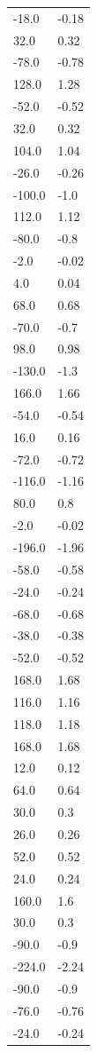 \begin{longtable}{ll}
-18.0 & -0.18 \\
32.0 & 0.32 \\
-78.0 & -0.78 \\
128.0 & 1.28 \\
-52.0 & -0.52 \\
32.0 & 0.32 \\
104.0 & 1.04 \\
-26.0 & -0.26 \\
-100.0 & -1.0 \\
112.0 & 1.12 \\
-80.0 & -0.8 \\
-2.0 & -0.02 \\
4.0 & 0.04 \\
68.0 & 0.68 \\
-70.0 & -0.7 \\
98.0 & 0.98 \\
-130.0 & -1.3 \\
166.0 & 1.66 \\
-54.0 & -0.54 \\
16.0 & 0.16 \\
-72.0 & -0.72 \\
-116.0 & -1.16 \\
80.0 & 0.8 \\
-2.0 & -0.02 \\
-196.0 & -1.96 \\
-58.0 & -0.58 \\
-24.0 & -0.24 \\
-68.0 & -0.68 \\
-38.0 & -0.38 \\
-52.0 & -0.52 \\
168.0 & 1.68 \\
116.0 & 1.16 \\
118.0 & 1.18 \\
168.0 & 1.68 \\
12.0 & 0.12 \\
64.0 & 0.64 \\
30.0 & 0.3 \\
26.0 & 0.26 \\
52.0 & 0.52 \\
24.0 & 0.24 \\
160.0 & 1.6 \\
30.0 & 0.3 \\
-90.0 & -0.9 \\
-224.0 & -2.24 \\
-90.0 & -0.9 \\
-76.0 & -0.76 \\
-24.0 & -0.24 \\

\end{longtable}
